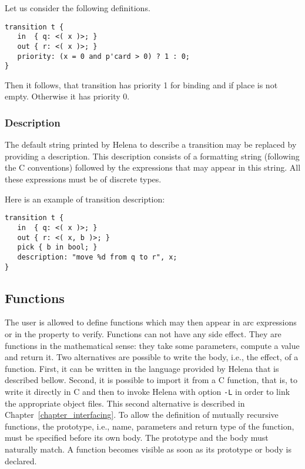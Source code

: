 Let us consider the following definitions.
\begin{lstlisting}
transition t {
   in  { q: <( x )>; }
   out { r: <( x )>; }
   priority: (x = 0 and p'card > 0) ? 1 : 0;
}
\end{lstlisting}
Then it follows, that transition  has priority 1 for binding
 and if place  is not empty.  Otherwise it has priority
0.
\\

\prioritydef


\subsubsection{Description}
The default string printed by Helena to describe a transition may be
replaced by providing a description.  This description consists of a
formatting string (following the C conventions) followed by the
expressions that may appear in this string.  All these expressions
must be of discrete types.

Here is an example of transition description:
\begin{lstlisting}
transition t {
   in  { q: <( x )>; }
   out { r: <( x, b )>; }
   pick { b in bool; }
   description: "move %d from q to r", x;
}
\end{lstlisting}

\descriptiondef


\subsection{Functions}
The user is allowed to define functions which may then appear in arc
expressions or in the property to verify.  Functions can not have any
side effect.  They are functions in the mathematical sense: they take
some parameters, compute a value and return it.  Two alternatives are
possible to write the body, i.e., the effect, of a function.  First,
it can be written in the language provided by Helena that is described
bellow.  Second, it is possible to import it from a C function, that
is, to write it directly in C and then to invoke Helena with option
\verb+-L+ in order to link the appropriate object files.  This second
alternative is described in Chapter~\ref{chapter_interfacing}.  To
allow the definition of mutually recursive functions, the prototype,
i.e., name, parameters and return type of the function, must be
specified before its own body.  The prototype and the body must
naturally match.  A function becomes visible as soon as its
prototype or body is declared.\\

